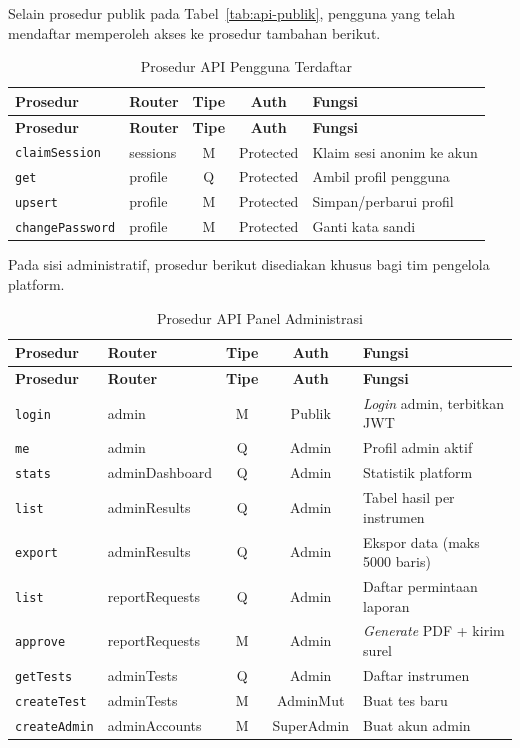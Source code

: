 Selain prosedur publik pada Tabel~\ref{tab:api-publik}, pengguna yang telah mendaftar memperoleh akses ke prosedur tambahan berikut.

\begin{xltabular}{\textwidth}{@{}l l c c >{\raggedright\arraybackslash}X@{}}
  \caption{Prosedur API Pengguna Terdaftar}
  \label{tab:api-user} \\
  \toprule
  \textbf{Prosedur} & \textbf{Router} & \textbf{Tipe} & \textbf{Auth} & \textbf{Fungsi} \\
  \midrule
  \endfirsthead
  \toprule
  \textbf{Prosedur} & \textbf{Router} & \textbf{Tipe} & \textbf{Auth} & \textbf{Fungsi} \\
  \midrule
  \endhead
  \bottomrule
  \endfoot
  \texttt{claimSession} & sessions & M & Protected & Klaim sesi anonim ke akun \\
  \texttt{get} & profile & Q & Protected & Ambil profil pengguna \\
  \texttt{upsert} & profile & M & Protected & Simpan/perbarui profil \\
  \texttt{changePassword} & profile & M & Protected & Ganti kata sandi \\
\end{xltabular}

Pada sisi administratif, prosedur berikut disediakan khusus bagi tim pengelola platform.

\begin{xltabular}{\textwidth}{@{}l l c c >{\raggedright\arraybackslash}X@{}}
  \caption{Prosedur API Panel Administrasi}
  \label{tab:api-admin} \\
  \toprule
  \textbf{Prosedur} & \textbf{Router} & \textbf{Tipe} & \textbf{Auth} & \textbf{Fungsi} \\
  \midrule
  \endfirsthead
  \toprule
  \textbf{Prosedur} & \textbf{Router} & \textbf{Tipe} & \textbf{Auth} & \textbf{Fungsi} \\
  \midrule
  \endhead
  \bottomrule
  \endfoot
  \texttt{login} & admin & M & Publik & \textit{Login} admin, terbitkan JWT \\
  \texttt{me} & admin & Q & Admin & Profil admin aktif \\
  \texttt{stats} & adminDashboard & Q & Admin & Statistik platform \\
  \texttt{list} & adminResults & Q & Admin & Tabel hasil per instrumen \\
  \texttt{export} & adminResults & Q & Admin & Ekspor data (maks 5000 baris) \\
  \texttt{list} & reportRequests & Q & Admin & Daftar permintaan laporan \\
  \texttt{approve} & reportRequests & M & Admin & \textit{Generate} PDF + kirim surel \\
  \texttt{getTests} & adminTests & Q & Admin & Daftar instrumen \\
  \texttt{createTest} & adminTests & M & AdminMut & Buat tes baru \\
  \texttt{createAdmin} & adminAccounts & M & SuperAdmin & Buat akun admin \\
\end{xltabular}

